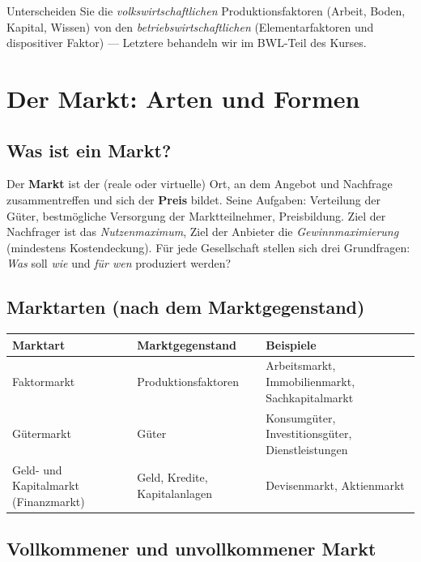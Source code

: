 \documentclass[11pt, a4paper]{article}
\begin{document}
\begin{merksatz}
Unterscheiden Sie die \emph{volkswirtschaftlichen} Produktionsfaktoren (Arbeit, Boden,
Kapital, Wissen) von den \emph{betriebswirtschaftlichen} (Elementarfaktoren und dispositiver
Faktor) --- Letztere behandeln wir im BWL-Teil des Kurses.
\end{merksatz}

\section{Der Markt: Arten und Formen}

\subsection{Was ist ein Markt?}

Der \textbf{Markt} ist der (reale oder virtuelle) Ort, an dem Angebot und Nachfrage
zusammentreffen und sich der \textbf{Preis} bildet. Seine Aufgaben: Verteilung der Güter,
bestmögliche Versorgung der Marktteilnehmer, Preisbildung. Ziel der Nachfrager ist das
\emph{Nutzenmaximum}, Ziel der Anbieter die \emph{Gewinnmaximierung} (mindestens
Kostendeckung). Für jede Gesellschaft stellen sich drei Grundfragen: \emph{Was} soll
\emph{wie} und \emph{für wen} produziert werden?

\subsection{Marktarten (nach dem Marktgegenstand)}

\begin{center}
\begin{tabular}{p{3.6cm} p{4.2cm} p{6.2cm}}
\textbf{Marktart} & \textbf{Marktgegenstand} & \textbf{Beispiele}\\
\hline
Faktormarkt & Produktionsfaktoren & Arbeitsmarkt, Immobilienmarkt, Sachkapitalmarkt\\
Gütermarkt & Güter & Konsumgüter, Investitionsgüter, Dienstleistungen\\
Geld- und Kapitalmarkt (Finanzmarkt) & Geld, Kredite, Kapitalanlagen & Devisenmarkt, Aktienmarkt\\
\end{tabular}
\end{center}

\subsection{Vollkommener und unvollkommener Markt}
\end{document}
